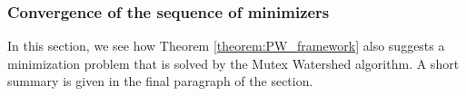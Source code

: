 
\subsubsection{Convergence of the sequence of minimizers}
In this section, we see how Theorem \ref{theorem:PW_framework} also suggests a minimization problem that is solved by the Mutex Watershed algorithm. A short summary is given in the final paragraph of the section.

